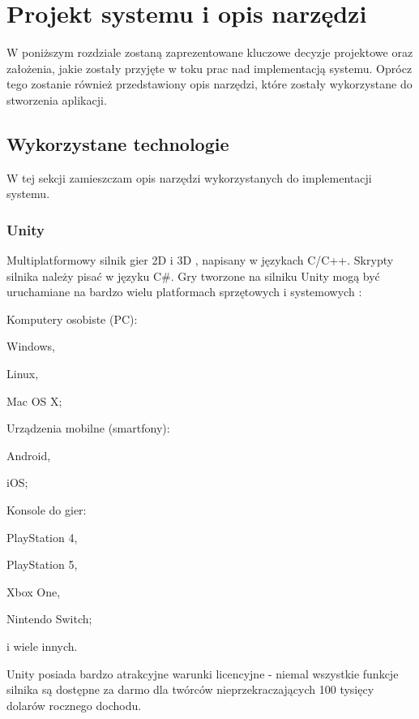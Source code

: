 \chapter{Projekt systemu i opis narzędzi}
\label{DesignSystemChapter}
W poniższym rozdziale zostaną zaprezentowane kluczowe decyzje projektowe oraz założenia, jakie zostały przyjęte w toku prac nad implementacją systemu. Oprócz tego zostanie również przedstawiony opis narzędzi, które zostały wykorzystane do stworzenia aplikacji.

\section{Wykorzystane technologie}
W tej sekcji zamieszczam opis narzędzi wykorzystanych do implementacji systemu.
\subsection{Unity}
Multiplatformowy silnik gier 2D i 3D \cite{unity:opis}, napisany w językach C/C++.
Skrypty silnika należy pisać w języku C\#.
Gry tworzone na silniku Unity mogą być uruchamiane na bardzo wielu platformach sprzętowych i systemowych \cite{unity:buildTargets}:
\begin{enumerate*}
\item Komputery osobiste (PC):
\begin{itemize*}
\item Windows,
\item Linux,
\item Mac OS X;
\end{itemize*}
\item Urządzenia mobilne (smartfony):
\begin{itemize*}
\item Android,
\item iOS;
\end{itemize*}
\item Konsole do gier:
\begin{itemize*}
\item PlayStation 4,
\item PlayStation 5,
\item Xbox One,
\item Nintendo Switch;
\end{itemize*}
\item i wiele innych.
\end{enumerate*}

Unity posiada bardzo atrakcyjne warunki licencyjne - niemal wszystkie funkcje silnika są dostępne za darmo dla twórców nieprzekraczających 100 tysięcy dolarów rocznego dochodu.

